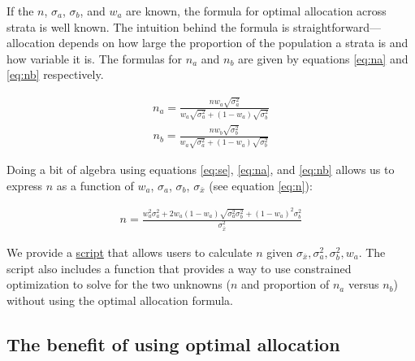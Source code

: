 \documentclass[12pt, letterpaper]{article}
\begin{document}
If the $n$, $\sigma_a$, $\sigma_b$, and $w_a$ are known, the formula for optimal allocation across strata is well known. The intuition behind the formula is straightforward---allocation depends on how large the proportion of the population a strata is and how variable it is. The formulas for $n_a$ and $n_b$ are given by equations \ref{eq:na} and \ref{eq:nb} respectively.

\begin{align}\label{eq:na}
n_a = \frac{n w_a \sqrt{\sigma_a^2}}{w_a \sqrt{\sigma_a^2} + (1 - w_a) \sqrt{\sigma_b^2}}
\end{align}
\begin{align}\label{eq:nb}
n_b = \frac{n w_b \sqrt{\sigma_b^2}}{w_a \sqrt{\sigma_a^2} + (1 - w_a) \sqrt{\sigma_b^2}}
\end{align}

Doing a bit of algebra using equations \ref{eq:se}, \ref{eq:na}, and \ref{eq:nb} allows us to express $n$ as a function of $w_a$, $\sigma_a$, $\sigma_b$, $\sigma_{\bar{x}}$ (see equation \ref{eq:n}):

\begin{align}\label{eq:n}
n  = \frac{w_a^2 \sigma_a^2 + 2 w_a (1 - w_a) \sqrt{\sigma_a^2 \sigma_b^2} + (1 - w_a)^2 \sigma_b^2}{\sigma_{\bar{x}}^2}
\end{align}\label{eq:n}

We provide a \href{https://github.com/soodoku/optimal\_data\_collection/scripts/smallest\_n\_for\_se.R}{script} that allows users to calculate $n$ given $\sigma_{\bar{x}}, \sigma_a^2, \sigma_b^2, w_a$. The script also includes a function that provides a way to use constrained optimization to solve for the two unknowns ($n$ and proportion of $n_a$ versus $n_b$) without using the optimal allocation formula.

\subsection*{The benefit of using optimal allocation}
\end{document}
